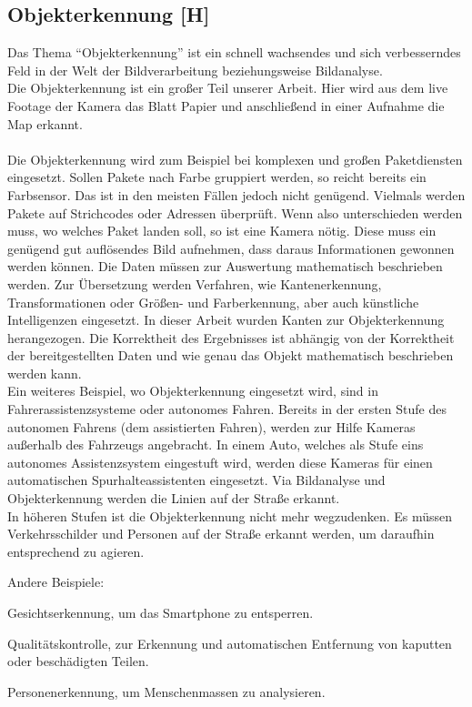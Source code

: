 \subsection{Objekterkennung [H]}
Das Thema ``Objekterkennung'' ist ein schnell wachsendes und sich verbesserndes Feld in der Welt der Bildverarbeitung beziehungsweise
Bildanalyse. \\
Die Objekterkennung ist ein großer Teil unserer Arbeit. Hier wird aus dem live Footage der Kamera das Blatt Papier und anschließend
in einer Aufnahme die Map erkannt.
\\
\\
Die Objekterkennung wird zum Beispiel bei komplexen und großen Paketdiensten eingesetzt. Sollen Pakete nach Farbe gruppiert werden, so
reicht bereits ein Farbsensor. Das ist in den meisten Fällen jedoch nicht genügend.
Vielmals werden Pakete auf Strichcodes oder Adressen überprüft.
Wenn also unterschieden werden muss, wo welches Paket landen soll, so ist eine Kamera nötig. Diese muss
ein genügend gut auflösendes Bild aufnehmen, dass daraus Informationen gewonnen werden können. Die Daten müssen zur Auswertung
mathematisch beschrieben werden. Zur Übersetzung werden Verfahren, wie Kantenerkennung, Transformationen oder Größen- und Farberkennung,
aber auch künstliche Intelligenzen
eingesetzt. In dieser Arbeit wurden Kanten zur Objekterkennung herangezogen.
Die Korrektheit des Ergebnisses ist abhängig von der Korrektheit der bereitgestellten Daten und wie genau das Objekt mathematisch
beschrieben werden kann. \cite{objekterkennung}
\\
Ein weiteres Beispiel, wo Objekterkennung eingesetzt wird, sind in
Fahrerassistenzsysteme oder autonomes Fahren. Bereits in der ersten Stufe des autonomen Fahrens (dem assistierten Fahren),
werden zur Hilfe Kameras außerhalb des Fahrzeugs angebracht. In einem Auto, welches als Stufe eins autonomes Assistenzsystem
eingestuft wird, werden diese Kameras für einen automatischen Spurhalteassistenten eingesetzt. Via Bildanalyse und Objekterkennung
werden die Linien auf der Straße erkannt. \\
In höheren Stufen ist die Objekterkennung nicht mehr wegzudenken. Es müssen Verkehrsschilder und Personen auf der Straße erkannt
werden, um daraufhin entsprechend zu agieren. \cite{selfdriving}

Andere Beispiele:
\begin{compactitem}
  \item Gesichtserkennung, um das Smartphone zu entsperren.
  \item Qualitätskontrolle, zur Erkennung und automatischen Entfernung von kaputten oder beschädigten Teilen.
  \item Personenerkennung, um Menschenmassen zu analysieren.
\end{compactitem}

